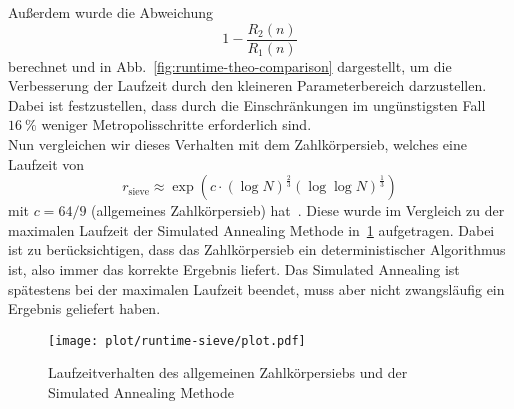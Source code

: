 Außerdem wurde die Abweichung
\begin{equation*}
		1-\frac{R_2\left(n\right)}{R_1\left(n\right)}
\end{equation*}
berechnet und in Abb.~\ref{fig:runtime-theo-comparison} dargestellt, um die Verbesserung der Laufzeit durch den kleineren Parameterbereich darzustellen. Dabei ist festzustellen, dass durch die Einschränkungen im ungünstigsten Fall $\SI{16}{\percent}$ weniger Metropolisschritte erforderlich sind. \\
Nun vergleichen wir dieses Verhalten mit dem Zahlkörpersieb, welches eine Laufzeit von 
\begin{equation}
		r_\mathrm{sieve}\approx\exp\left(c\cdot{\left(\log N\right)}^\frac{2}{3}{\left(\log\log N\right)}^\frac{1}{3}\right)\label{eq:runtime-sieve}
\end{equation}
mit $c=64/9$ (allgemeines Zahlkörpersieb) hat~\parencite{pomerance}. Diese wurde im Vergleich zu der maximalen Laufzeit der Simulated Annealing Methode in~\ref{fig:runtime-sieve} aufgetragen. Dabei ist zu berücksichtigen, dass das Zahlkörpersieb ein deterministischer Algorithmus ist, also immer das korrekte Ergebnis liefert. Das Simulated Annealing ist spätestens bei der maximalen Laufzeit beendet, muss aber nicht zwangsläufig ein Ergebnis geliefert haben.

\begin{figure}[!ht]
		\centering
		\texttt{[image: plot/runtime-sieve/plot.pdf]}
		\caption{Laufzeitverhalten des allgemeinen Zahlkörpersiebs und der Simulated Annealing Methode}\label{fig:runtime-sieve}
\end{figure}

